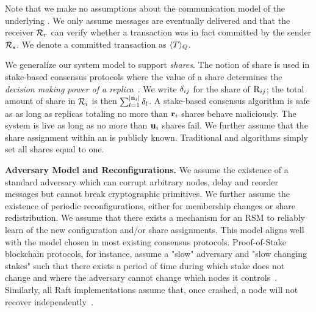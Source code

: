 Note that we make no assumptions about the communication model of the underlying \RSM{}. 
We only assume messages are eventually delivered and that the receiver \RSM{} $\mathcal{R}_{r}$ can verify whether a transaction was in fact 
committed by the sender \RSM{} $\mathcal{R}_{s}$. 
We denote a committed transaction as $\SignMessage{\Transaction}{Q}$.

We generalize our system model to support \textit{shares}. The notion of share is used in stake-based \BFT{} consensus protocols where the value of a share determines the \textit{decision making power of a replica}~\cite{blockchain-book}. We write
${\delta}_{ij}$ for the share of $\textsc{R}_{{i}{j}}$; the total amount of share in \RSM{} $\mathcal{R}_{i}$ is then 
$\sum_{l=1}^{\lvert \textbf{n}_{i} \rvert} {\delta}_{l}$.
A stake-based consensus algorithm is safe as  as long as replicas totaling no more than $\textbf{r}_{i}$ shares behave maliciously. The system is live as long as no more than $\textbf{u}_{i}$ shares fail. We further assume that the share assignment within an \RSM{} is publicly known. Traditional \CFT{} and \BFT{} algorithms simply set all shares equal to one.

{\bf Adversary Model and Reconfigurations.}
We assume the existence of a standard adversary which can corrupt arbitrary nodes, delay and reorder messages but cannot break cryptographic primitives.
We further assume the existence of periodic reconfigurations, either for membership changes or share redistribution. We assume that there exists a mechanism for an RSM to reliably learn of the new configuration and/or share assignments. This model aligns well with the model chosen in most existing consensus protocols. Proof-of-Stake blockchain protocols, for instance, assume a "slow" adversary and "slow changing stakes" such that there exists a period of time during which stake does not change and where the adversary cannot change which nodes it controls~\cite{ethereum-stake-withdrawl,algorand-stake-withdrawl}.  Similarly, all Raft implementations assume that, once crashed, a node will not recover independently~\cite{etcd-raft}. 


